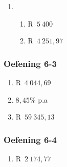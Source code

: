 {\begin{multicols}{3}
\begin{enumerate}[label=\textbf{\arabic*}.]
	\item %
	\begin{enumerate}[noitemsep, label=\textbf{(\alph*)} ]
	    \item R~$5~400$%
	    \item R~$4~251,97$%
	\end{enumerate}
    \end{enumerate}

\subsubsection*{Oefening 6-3} %

    \begin{enumerate}[label=\textbf{\arabic*}.]
	\item R~$4~044,69$%

	\item $8,45\%$ p.a%

	\item R~$59~345,13$%
    \end{enumerate}


\subsubsection*{Oefening 6-4} %

    \begin{enumerate}[label=\textbf{\arabic*}.]
	\item R~$2~174,77$%


\end{enumerate}
\end{multicols}}
